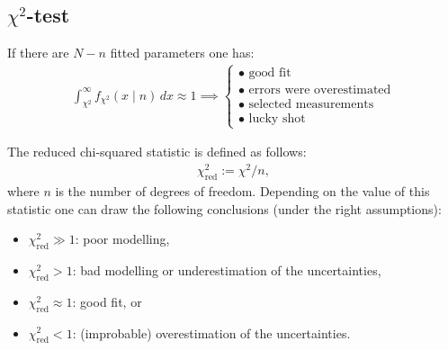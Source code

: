 
\subsection{\texorpdfstring{$\chi^2$}{Chi squared}-test}\label{section:chi_squared_test}

    \begin{property}\label{statistics:chi_square}
        If there are $N - n$ fitted parameters one has:
        \begin{gather}
            \int_{\chi^2}^\infty f_{\chi^2}(x\mid n)\,dx \approx 1\implies
            \begin{cases}
                \bullet\text{ good fit}\\
                \bullet\text{ errors were overestimated}\\
                \bullet\text{ selected measurements}\\
                \bullet\text{ lucky shot}
            \end{cases}
        \end{gather}
    \end{property}
    \begin{property}
        The reduced chi-squared statistic is defined as follows:
        \begin{gather}
            \chi^2_\text{red} := \chi^2/n,
        \end{gather}
        where $n$ is the number of degrees of freedom. Depending on the value of this statistic one can draw the following conclusions (under the right assumptions):
        \begin{itemize}
            \item $\chi^2_\text{red}\gg1$: poor modelling,
            \item $\chi^2_\text{red}>1$: bad modelling or underestimation of the uncertainties,
            \item $\chi^2_\text{red}\approx1$: good fit, or
            \item $\chi^2_\text{red}<1$: (improbable) overestimation of the uncertainties.
        \end{itemize}
    \end{property}

